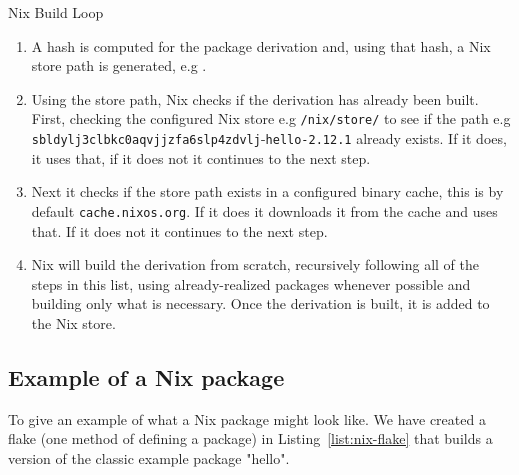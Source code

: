 \begin{figureBox}[label = {fig:nix-derivation-loop}, width=0.8\linewidth]{Nix Build Loop}
  { \footnotesize
  \begin{enumerate} [itemsep=-0.2em]
    \item A hash is computed for the package derivation and, using that hash, a Nix store path is generated, e.g .
    \item  Using the store path, Nix checks if the derivation has already been built. First, checking the configured Nix store e.g {\color{Purple}\texttt{/nix/store/}} to see if the path e.g {\color{RoyalBlue}\texttt{sbldylj3clbkc0aqvjjzfa6slp4zdvlj}}-{\color{Orange}\texttt{hello-2.12.1}} already exists. If it does, it uses that, if it does not it continues to the next step.
    \item Next it checks if the store path exists in a configured binary cache, this is by default \texttt{cache.nixos.org}. If it does it downloads it from the cache and uses that. If it does not it continues to the next step.
    \item Nix will build the derivation from scratch, recursively following all of the steps in this list, using already-realized packages whenever possible and building only what is necessary. Once the derivation is built, it is added to the Nix store.
  \end{enumerate}
  }
\end{figureBox}

\subsection{Example of a Nix package}

To give an example of what a Nix package might look like. We have created a flake (one method of defining a package) in Listing~\ref{list:nix-flake} that builds a version of the classic example package "hello". 



